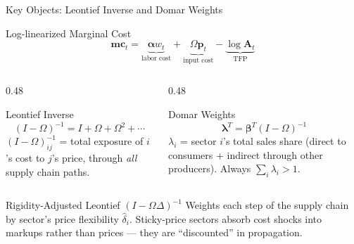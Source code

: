 \documentclass[aspectratio=169]{beamer}
\begin{document}
\begin{frame}{Key Objects: Leontief Inverse and Domar Weights}

\begin{block}{Log-linearized Marginal Cost}
\begin{equation*}
    \bm{mc}_t = \underbrace{\bm{\alpha} w_t}_{\text{labor cost}} + \underbrace{\Omega\bm{p}_t}_{\text{input cost}} - \underbrace{\log\mathbf{A}_t}_{\text{TFP}}
\end{equation*}
\end{block}

\begin{columns}
\begin{column}{0.48\textwidth}
\begin{block}{Leontief Inverse}
\begin{equation*}
    (I-\Omega)^{-1} = I + \Omega + \Omega^2 + \cdots
\end{equation*}
$(I-\Omega)^{-1}_{ij}$ = total exposure of $i$'s cost to $j$'s price, through \textit{all} supply chain paths.
\end{block}
\end{column}
\begin{column}{0.48\textwidth}
\begin{block}{Domar Weights}
\begin{equation*}
    \bm{\lambda}^T = \bm{\beta}^T(I-\Omega)^{-1}
\end{equation*}
$\lambda_i$ = sector $i$'s total sales share (direct to consumers + indirect through other producers). Always $\sum_i \lambda_i > 1$.
\end{block}
\end{column}
\end{columns}

\vspace{0.3cm}
\begin{exampleblock}{Rigidity-Adjusted Leontief $(I-\Omega\Delta)^{-1}$}
Weights each step of the supply chain by sector's price flexibility $\hat{\delta}_i$. Sticky-price sectors absorb cost shocks into markups rather than prices --- they are ``discounted'' in propagation.
\end{exampleblock}
\end{frame}
\end{document}
